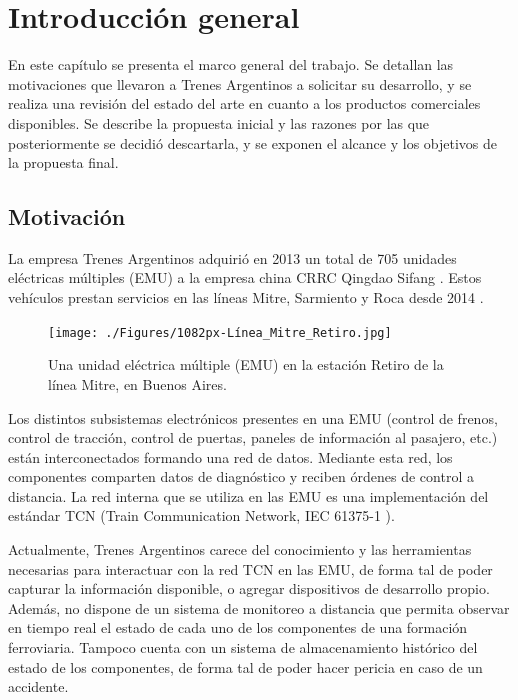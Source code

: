 \chapter{Introducción general}

En este capítulo se presenta el marco general del trabajo. Se detallan las motivaciones que llevaron a Trenes Argentinos a solicitar su desarrollo, y se realiza una revisión del estado del arte en cuanto a los productos comerciales disponibles. Se describe la propuesta inicial y las razones por las que posteriormente se decidió descartarla, y se exponen el alcance y los objetivos de la propuesta final.

\label{cap:IntroGeneral}

\section{Motivación}

La empresa Trenes Argentinos \cite{web:sofse} adquirió en 2013 un total de 705 unidades eléctricas múltiples (EMU) a la empresa china CRRC Qingdao Sifang \cite{web:sifang} \cite{licitacion1}. Estos vehículos prestan servicios en las líneas Mitre, Sarmiento y Roca desde 2014 \cite{emu:roca} \cite{emu:mitre-sarmiento}.


\begin{figure}[htbp]
	\centering
	\texttt{[image: ./Figures/1082px-Línea\_Mitre\_Retiro.jpg]}
	\caption[Unidad eléctrica múltiple (EMU)]{Una unidad eléctrica múltiple (EMU) en la estación Retiro de la línea Mitre, en Buenos Aires.\footnotemark}
	\label{fig:emu}
\end{figure}

Los distintos subsistemas electrónicos presentes en una EMU (control de frenos, control de tracción, control de puertas, paneles de información al pasajero, etc.) están interconectados formando una red de datos. Mediante esta red, los componentes comparten datos de diagnóstico y reciben órdenes de control a distancia. La red interna que se utiliza en las EMU es una implementación del estándar TCN (Train Communication Network, IEC 61375-1 \cite{iec61375-1}).

Actualmente, Trenes Argentinos carece del conocimiento y las herramientas necesarias para interactuar con la red TCN en las EMU, de forma tal de poder capturar la información disponible, o agregar dispositivos de desarrollo propio.
Además, no dispone de un sistema de monitoreo a distancia que permita observar en tiempo real el estado de cada uno de los componentes de una formación ferroviaria.
Tampoco cuenta con un sistema de almacenamiento histórico del estado de los componentes, de forma tal de poder hacer pericia en caso de un accidente.

